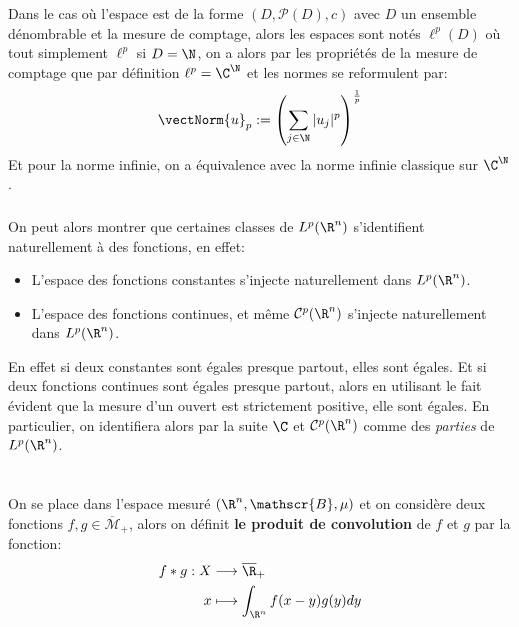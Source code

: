 \subsection*{}
Dans le cas où l'espace est de la forme \( (D, \mathscr{P}(D), c) \) avec \( D \) un ensemble dénombrable et la mesure de comptage, alors les espaces sont notés \( \ell^p(D) \) où tout simplement \( \ell^p \) si \( D = \N \), on a alors par les propriétés de la mesure de comptage que par définition \( \ell^p = \C^\N \) et les normes se reformulent par:
\[ 
   \vectNorm{u}_p := \left (\sum_{j \in \N} |u_j|^p \right )^{\frac{1}{p}}
\]
Et pour la norme infinie, on a équivalence avec la norme infinie classique sur \( \C^\N \).
\subsection*{}
On peut alors montrer que certaines classes de \( L^p(\R^n) \) s'identifient naturellement à des fonctions, en effet:
\begin{itemize}
   \item L'espace des fonctions constantes s'injecte naturellement dans \( L^p( \R^n) \).
   \item L'espace des fonctions continues, et même \(  \mathcal{C}^p(\R^n) \) s'injecte naturellement dans \( L^p( \R^n) \).
\end{itemize}
En effet si deux constantes sont égales presque partout, elles sont égales. Et si deux fonctions continues sont égales presque partout, alors en utilisant le fait évident que la mesure d'un ouvert est strictement positive, elle sont égales. En particulier, on identifiera alors par la suite \( \C \) et \(  \mathcal{C}^p( \R^n) \) comme des \textit{parties} de \( L^p( \R^n) \).
\chapter*{} %
On se place dans l'espace mesuré \( (\R^n, \mathscr{B}, \mu) \) et on considère deux fonctions \( f, g \in \overline{\mathscr{M}}_+ \), alors on définit \textbf{le produit de convolution} de \( f \) et \( g \) par la fonction:
\[ 
   \begin{aligned}
      f * g : X &\longrightarrow \overline{\R}_+ \\
      x &\longmapsto \int_{\R^n} f(x - y)g(y) dy 
   \end{aligned}
\]
